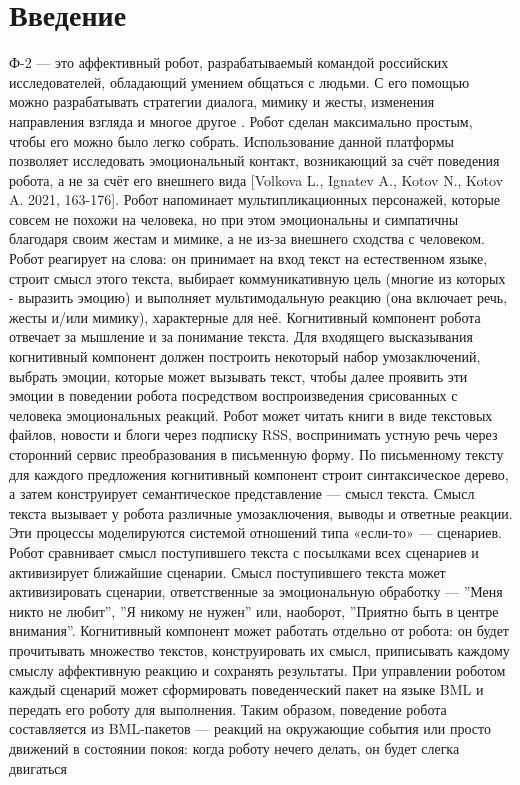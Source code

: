 \chapter*{Введение}
Ф-2 --- это аффективный робот, разрабатываемый командой российских исследователей, обладающий умением общаться с людьми. С его помощью можно разрабатывать стратегии диалога, мимику и жесты, изменения направления взгляда и многое другое \cite{robot_2}. Робот сделан максимально простым, чтобы его можно было легко собрать. Использование данной платформы позволяет исследовать эмоциональный контакт, возникающий за счёт поведения робота, а не за счёт его внешнего вида [Volkova L., Ignatev A., Kotov N., Kotov A. 2021, 163-176]. Робот напоминает мультипликационных персонажей, которые совсем не похожи на человека, но при этом эмоциональны и симпатичны благодаря своим жестам и мимике, а не из-за внешнего сходства с человеком. Робот реагирует на слова: он принимает на вход текст на естественном языке, строит смысл этого текста, выбирает коммуникативную цель (многие из которых - выразить эмоцию) и выполняет мультимодальную реакцию (она включает речь, жесты и/или мимику), характерные для неё. Когнитивный компонент робота отвечает за мышление и за понимание текста. Для входящего высказывания когнитивный компонент должен построить некоторый набор умозаключений, выбрать эмоции, которые может вызывать текст, чтобы далее проявить эти эмоции в поведении робота посредством воспроизведения срисованных с человека эмоциональных реакций. Робот может читать книги в виде текстовых файлов, новости и блоги через подписку RSS, воспринимать устную речь через сторонний сервис преобразования в письменную форму. По письменному тексту для каждого предложения когнитивный компонент строит синтаксическое дерево, а затем конструирует семантическое представление --- смысл текста. Смысл текста вызывает у робота различные умозаключения, выводы и ответные реакции. Эти процессы моделируются системой отношений типа «если-то» --- сценариев. Робот сравнивает смысл поступившего текста с посылками всех сценариев и активизирует ближайшие сценарии. Смысл поступившего текста может активизировать сценарии, ответственные за эмоциональную обработку --- ''Меня никто не любит'', ''Я никому не нужен'' или, наоборот, ''Приятно быть в центре внимания''. Когнитивный компонент может работать отдельно от робота: он будет прочитывать множество текстов, конструировать их смысл, приписывать каждому смыслу аффективную реакцию и сохранять результаты. При управлении роботом каждый сценарий может сформировать поведенческий пакет на языке BML и передать его роботу для выполнения. Таким образом, поведение робота составляется из BML-пакетов --- реакций на окружающие события или просто движений в состоянии покоя: когда роботу нечего делать, он будет слегка двигаться \cite{f2} 

